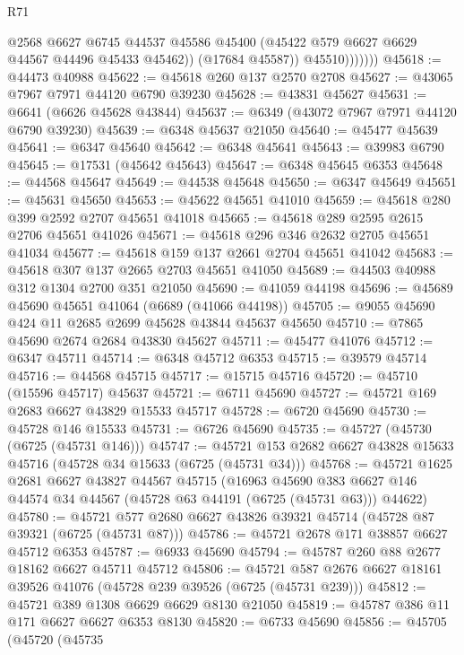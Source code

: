 \begin{lexlean}{R71}
\begin{coremodule}
                      @2568
                      @6627
                      @6745
                      @44537
                      @45586
                      @45400
                      (@45422 @579 @6627 @6629 @44567 @44496 @45433 @45462))
                    (@17684 @45587))
                  @45510)))))))
@45618 := @44473 @40988
@45622 := @45618 @260 @137 @2570 @2708
@45627 := @43065 @7967 @7971 @44120 @6790 @39230
@45628 := @43831 @45627
@45631 := @6641 (@6626 @45628 @43844)
@45637 := @6349 (@43072 @7967 @7971 @44120 @6790 @39230)
@45639 := @6348 @45637 @21050
@45640 := @45477 @45639
@45641 := @6347 @45640
@45642 := @6348 @45641
@45643 := @39983 @6790
@45645 := @17531 (@45642 @45643)
@45647 := @6348 @45645 @6353
@45648 := @44568 @45647
@45649 := @44538 @45648
@45650 := @6347 @45649
@45651 := @45631 @45650
@45653 := @45622 @45651 @41010
@45659 := @45618 @280 @399 @2592 @2707 @45651 @41018
@45665 := @45618 @289 @2595 @2615 @2706 @45651 @41026
@45671 := @45618 @296 @346 @2632 @2705 @45651 @41034
@45677 := @45618 @159 @137 @2661 @2704 @45651 @41042
@45683 := @45618 @307 @137 @2665 @2703 @45651 @41050
@45689 := @44503 @40988 @312 @1304 @2700 @351 @21050
@45690 := @41059 @44198
@45696 := @45689 @45690 @45651 @41064 (@6689 (@41066 @44198))
@45705 := @9055 @45690 @424 @11 @2685 @2699 @45628 @43844 @45637 @45650
@45710 := @7865 @45690 @2674 @2684 @43830 @45627
@45711 := @45477 @41076
@45712 := @6347 @45711
@45714 := @6348 @45712 @6353
@45715 := @39579 @45714
@45716 := @44568 @45715
@45717 := @15715 @45716
@45720 := @45710 (@15596 @45717) @45637
@45721 := @6711 @45690
@45727 := @45721 @169 @2683 @6627 @43829 @15533 @45717
@45728 := @6720 @45690
@45730 := @45728 @146 @15533
@45731 := @6726 @45690
@45735 := @45727 (@45730 (@6725 (@45731 @146)))
@45747 := @45721 @153 @2682 @6627 @43828 @15633 @45716 (@45728 @34 @15633 (@6725 (@45731 @34)))
@45768 := @45721
    @1625
    @2681
    @6627
    @43827
    @44567
    @45715
    (@16963
      @45690
      @383
      @6627
      @146
      @44574
      @34
      @44567
      (@45728 @63 @44191 (@6725 (@45731 @63)))
      @44622)
@45780 := @45721 @577 @2680 @6627 @43826 @39321 @45714 (@45728 @87 @39321 (@6725 (@45731 @87)))
@45786 := @45721 @2678 @171 @38857 @6627 @45712 @6353
@45787 := @6933 @45690
@45794 := @45787 @260 @88 @2677 @18162 @6627 @45711 @45712
@45806 := @45721 @587 @2676 @6627 @18161 @39526 @41076 (@45728 @239 @39526 (@6725 (@45731 @239)))
@45812 := @45721 @389 @1308 @6629 @6629 @8130 @21050
@45819 := @45787 @386 @11 @171 @6627 @6627 @6353 @8130
@45820 := @6733 @45690
@45856 := @45705
    (@45720
      (@45735

\end{coremodule}
\end{lexlean}
